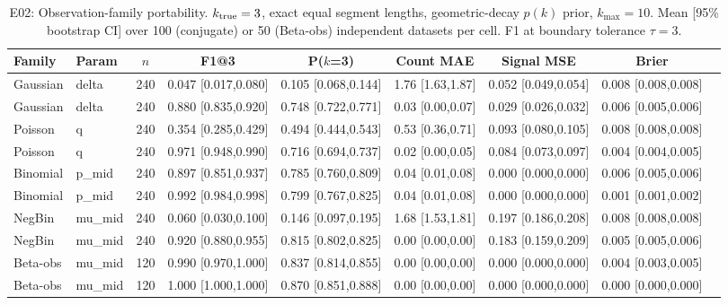 \begin{table}[!htbp]
\centering
\footnotesize
\caption{E02: Observation-family portability. $k_{\rm true}=3$, exact equal segment lengths, geometric-decay $p(k)$ prior, $k_{\max}=10$. Mean [95\% bootstrap CI] over 100 (conjugate) or 50 (Beta-obs) independent datasets per cell. F1 at boundary tolerance $\tau=3$.}
\label{tab:E02-recovery-paper}
\begin{tabular}{llccccccc}
\toprule
Family & Param & $n$ & F1@3 & P($k$=3) & Count MAE & Signal MSE & Brier \\
\midrule
Gaussian & delta & 240 & 0.047 [0.017,0.080] & 0.105 [0.068,0.144] & 1.76 [1.63,1.87] & 0.052 [0.049,0.054] & 0.008 [0.008,0.008] \\
Gaussian & delta & 240 & 0.880 [0.835,0.920] & 0.748 [0.722,0.771] & 0.03 [0.00,0.07] & 0.029 [0.026,0.032] & 0.006 [0.005,0.006] \\
\midrule
Poisson & q & 240 & 0.354 [0.285,0.429] & 0.494 [0.444,0.543] & 0.53 [0.36,0.71] & 0.093 [0.080,0.105] & 0.008 [0.008,0.008] \\
Poisson & q & 240 & 0.971 [0.948,0.990] & 0.716 [0.694,0.737] & 0.02 [0.00,0.05] & 0.084 [0.073,0.097] & 0.004 [0.004,0.005] \\
\midrule
Binomial & p_mid & 240 & 0.897 [0.851,0.937] & 0.785 [0.760,0.809] & 0.04 [0.01,0.08] & 0.000 [0.000,0.000] & 0.006 [0.005,0.006] \\
Binomial & p_mid & 240 & 0.992 [0.984,0.998] & 0.799 [0.767,0.825] & 0.04 [0.01,0.08] & 0.000 [0.000,0.000] & 0.001 [0.001,0.002] \\
\midrule
NegBin & mu_mid & 240 & 0.060 [0.030,0.100] & 0.146 [0.097,0.195] & 1.68 [1.53,1.81] & 0.197 [0.186,0.208] & 0.008 [0.008,0.008] \\
NegBin & mu_mid & 240 & 0.920 [0.880,0.955] & 0.815 [0.802,0.825] & 0.00 [0.00,0.00] & 0.183 [0.159,0.209] & 0.005 [0.005,0.006] \\
\midrule
Beta-obs & mu_mid & 120 & 0.990 [0.970,1.000] & 0.837 [0.814,0.855] & 0.00 [0.00,0.00] & 0.000 [0.000,0.000] & 0.004 [0.003,0.005] \\
Beta-obs & mu_mid & 120 & 1.000 [1.000,1.000] & 0.870 [0.851,0.888] & 0.00 [0.00,0.00] & 0.000 [0.000,0.000] & 0.000 [0.000,0.000] \\
\bottomrule
\end{tabular}
\end{table}
